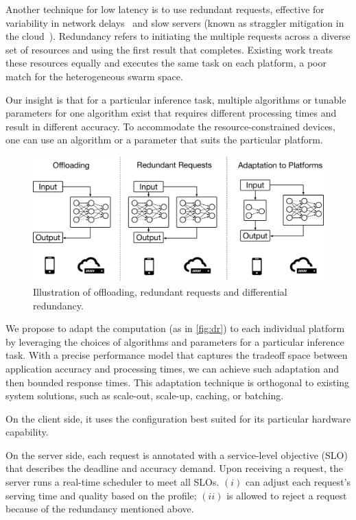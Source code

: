 Another technique for low latency is to use redundant requests, effective for
variability in network delays~\cite{gordon2015accelerating, vulimiri2013low} and
slow servers (known as straggler mitigation in the cloud~\cite{dean2013tail,
  ananthanarayanan2013effective}). Redundancy refers to initiating the multiple
requests across a diverse set of resources and using the first result that
completes. Existing work treats these resources equally and executes the same
task on each platform, a poor match for the heterogeneous swarm space.



Our insight is that for a particular inference task, multiple algorithms or
tunable parameters for one algorithm exist that requires different processing
times and result in different accuracy. To accommodate the resource-constrained
devices, one can use an algorithm or a parameter that suits the particular
platform.

\begin{figure}
  \centering
  \includegraphics[width=0.8\columnwidth]{figures/dr.pdf}
  \caption{Illustration of offloading, redundant requests and differential
    redundancy.}
  \label{fig:dr}
\end{figure}

We propose to adapt the computation (as in \autoref{fig:dr}) to each individual
platform by leveraging the choices of algorithms and parameters for a particular
inference task. With a precise performance model that captures the tradeoff
space between application accuracy and processing times, we can achieve such
adaptation and then bounded response times. This adaptation technique is
orthogonal to existing system solutions, such as scale-out, scale-up, caching,
or batching.

On the client side, it uses the configuration best suited for its particular
hardware capability.

On the server side, each request is annotated with a service-level objective
(SLO) that describes the deadline and accuracy demand. Upon receiving a request,
the server runs a real-time scheduler to meet all SLOs. $(i)$ \brt{} can adjust
each request's serving time and quality based on the profile; $(ii)$ \brt{} is
allowed to reject a request because of the redundancy mentioned above.

